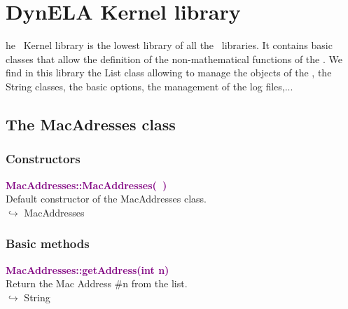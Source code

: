 %
%
%
\chapter{DynELA Kernel library}

\startcontents[chapters]
\printmyminitoc[2]he \DynELA~Kernel library is the lowest library of all the \DynELA~libraries. It contains basic classes that allow the definition of the non-mathematical functions of the \DynELA. We find in this library the List class allowing to manage the objects of the \DynELA, the String classes, the basic options, the management of the log files,...

\section{The MacAdresses class}

\subsection{Constructors}

\textcolor{purple}{\textbf{MacAddresses::MacAddresses(~)}}\label{MacAddresses::MacAddresses()}\\
Default constructor of the MacAddresses class.\\ \hspace*{10mm}$\hookrightarrow$ MacAddresses


\subsection{Basic methods}

\textcolor{purple}{\textbf{MacAddresses::getAddress(int n)}}\label{MacAddresses::getAddress(int n)}\\
Return the Mac Address \#n from the list.\\ \hspace*{10mm}$\hookrightarrow$ String

